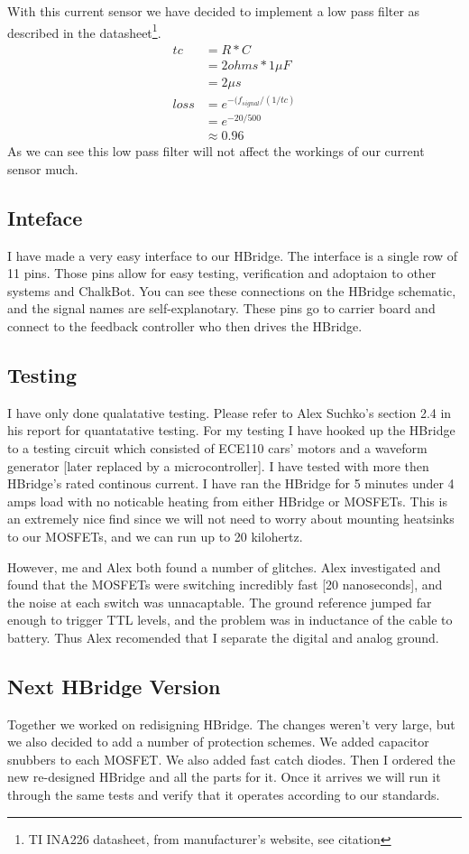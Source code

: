 \documentclass[12pt]{article}
\begin{document}
With this current sensor we have decided to implement a low pass filter as described in the datasheet\footnote{TI INA226 datasheet, from manufacturer's website, see citation}. 
\begin{align}
tc &= R* C
\\&= 2 ohms * 1 \mu F
\\&= 2 \mu s
\\loss &= e^{-(f_{signal} / (1/tc)}
\\&=e^{-20/500}
\\&\approx0.96
\end{align}
As we can see this low pass filter will not affect the workings of our current sensor much.
\subsection{Inteface}
I have made a very easy interface to our HBridge. The interface is a single row of 11 pins. Those pins allow for easy testing, verification and adoptaion to other systems and ChalkBot. You can see these connections on the HBridge schematic, and the signal names are self-explanotary.  These pins go to carrier board and connect to the feedback controller who then drives the HBridge. 
\subsection{Testing}
I have only done qualatative testing. Please refer to Alex Suchko's section 2.4 in his report for quantatative testing. For my testing I have hooked up the HBridge to a testing circuit which consisted of ECE110 cars' motors and a waveform generator [later replaced by a microcontroller]. I have tested with more then HBridge's rated continous current. I have ran the HBridge for 5 minutes under 4 amps load with no noticable heating from either HBridge or MOSFETs. This is an extremely nice find since we will not need to worry about mounting heatsinks to our MOSFETs, and we can run up to 20 kilohertz.

However, me and Alex both found a number of glitches. Alex investigated and found that the MOSFETs were switching incredibly fast [20 nanoseconds], and the noise at each switch was unnacaptable. The ground reference jumped far enough to trigger TTL levels, and the problem was in inductance of the cable to battery.  Thus Alex recomended that I separate the digital and analog ground.
\subsection{Next HBridge Version}
Together we worked on redisigning HBridge. The changes weren't very large, but we also decided to add a number of protection schemes. We added capacitor snubbers to each MOSFET. We also added fast catch diodes. Then I ordered the new re-designed HBridge and all the parts for it. Once it arrives we will run it through the same tests and verify that it operates according to our standards.
\newpage
\end{document}
